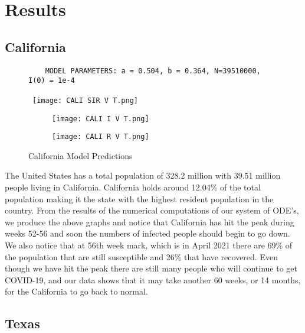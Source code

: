 \documentclass[a4paper,10pt]{article}
\begin{document}
\newpage
\section{Results}

\subsection{California}

\begin{figure}[!htb]
\centering
\begin{verbatim}
    MODEL PARAMETERS: a = 0.504, b = 0.364, N=39510000, I(0) = 1e-4
\end{verbatim}\
\texttt{[image: CALI SIR V T.png]}
\begin{subfigure}{.5\textwidth}
  \centering
  \texttt{[image: CALI I V T.png]}
  \label{fig:cali1}
\end{subfigure}%
\begin{subfigure}{.5\textwidth}
  \centering
  \texttt{[image: CALI R V T.png]}
  \label{fig:cali2}
\end{subfigure}
\caption{California Model Predictions}
\label{fig:cali}
\end{figure}
\FloatBarrier

The United States has a total population of 328.2 million with 39.51 million people living in California. California holds around 12.04\% of the total population making it the state with the highest resident population in the country. From the results of the numerical computations of our system of ODE's, we produce the above graphs and notice that California has hit the peak during weeks 52-56 and soon the numbers of infected people should begin to go down. We also notice that at 56th  week mark, which is in April 2021 there are 69\% of the population that are still susceptible and 26\% that have recovered. Even though we have hit the peak there are still many people who will continue to get COVID-19, and our data shows that it may take another 60 weeks, or 14 months, for the California to go back to normal. 
\clearpage
\newpage
\subsection{Texas}
\end{document}
